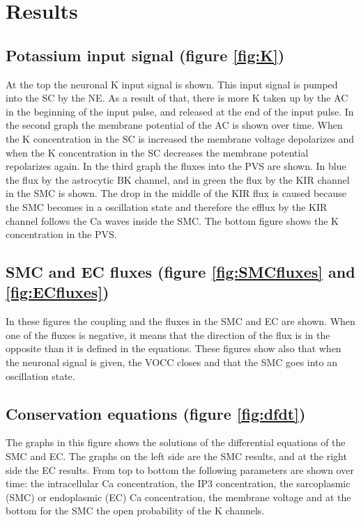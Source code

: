 \section{Results}

\subsection*{Potassium input signal (figure \ref{fig:K})}
At the top the neuronal \gls{K} input signal is shown. This input signal is pumped into the SC by the \gls{NE}. As a result of that, there is more \gls{K} taken up by the \gls{AC} in the beginning of the input pulse, and released at the end of the input pulse. In the second graph the membrane potential of the AC is shown over time. When the \gls{K} concentration in the SC is increased the membrane voltage depolarizes and when the \gls{K} concentration in the SC decreases the membrane potential repolarizes again.
In the third graph the fluxes into the PVS are shown. In blue the flux by the astrocytic BK channel, and in green the flux by the KIR channel in the SMC is shown. The drop in the middle of the KIR flux is caused because the SMC becomes in a oscillation state and therefore the efflux by the KIR channel follows the \gls{Ca} waves inside the SMC.
The bottom figure shows the \gls{K} concentration in the PVS.

\subsection*{SMC and EC fluxes (figure \ref{fig:SMCfluxes} and \ref{fig:ECfluxes})}
In these figures the coupling and the fluxes in the SMC and EC are shown. When one of the fluxes is negative, it means that the direction of the flux is in the opposite than it is defined in the equations. These figures show also that when the neuronal signal is given, the VOCC closes and that the SMC goes into an oscillation state. 

\subsection*{Conservation equations (figure \ref{fig:dfdt})}
The graphs in this figure shows the solutions of the differential equations of the \gls{SMC} and \gls{EC}. The graphs on the left side are the SMC results, and at the right side the EC results. From top to bottom the following parameters are shown over time: the intracellular \gls{Ca} concentration, the \gls{IP3} concentration, the sarcoplasmic (\gls{SMC}) or endoplasmic (\gls{EC}) \gls{Ca} concentration, the membrane voltage and at the bottom for the SMC the open probability of the \gls{K} channels.

